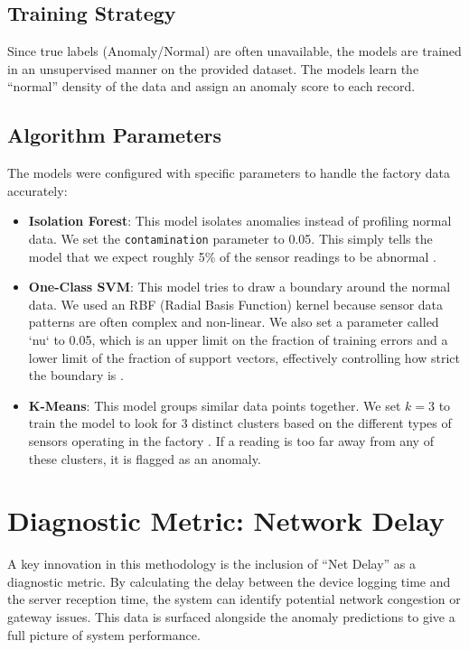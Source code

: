 \subsection{Training Strategy}
Since true labels (Anomaly/Normal) are often unavailable, the models are trained in an unsupervised manner on the provided dataset. The models learn the ``normal'' density of the data and assign an anomaly score to each record. 

\subsection{Algorithm Parameters}
The models were configured with specific parameters to handle the factory data accurately:
\begin{itemize}
    \item \textbf{Isolation Forest}: This model isolates anomalies instead of profiling normal data. We set the \texttt{contamination} parameter to 0.05. This simply tells the model that we expect roughly 5\% of the sensor readings to be abnormal \cite{liu2008}.
    \item \textbf{One-Class SVM}: This model tries to draw a boundary around the normal data. We used an RBF (Radial Basis Function) kernel because sensor data patterns are often complex and non-linear. We also set a parameter called `nu` to 0.05, which is an upper limit on the fraction of training errors and a lower limit of the fraction of support vectors, effectively controlling how strict the boundary is \cite{scholkopf2001}.
    \item \textbf{K-Means}: This model groups similar data points together. We set $k=3$ to train the model to look for 3 distinct clusters based on the different types of sensors operating in the factory \cite{jain2010}. If a reading is too far away from any of these clusters, it is flagged as an anomaly.
\end{itemize}

\section{Diagnostic Metric: Network Delay}
A key innovation in this methodology is the inclusion of ``Net Delay'' as a diagnostic metric. By calculating the delay between the device logging time and the server reception time, the system can identify potential network congestion or gateway issues. This data is surfaced alongside the anomaly predictions to give a full picture of system performance.
